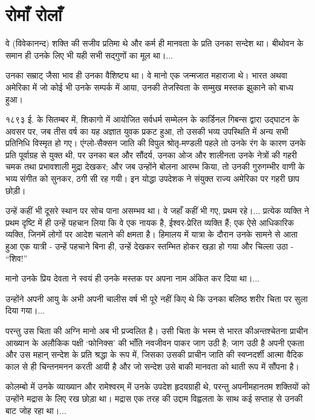 \section*{रोमाँ रोलाँ}


वे (विवेकानन्द) शक्ति की सजीव प्रतिमा थे और कर्म ही मानवता के प्रति उनका सन्देश था। बीथोवन के समान ही उनके लिए भी यही सभी सद्गुणों का मूल था।... 

उनका सम्राट् जैसा भाव ही उनका वैशिष्ट्य था। वे मानो एक जन्मजात महाराजा थे। भारत अथवा अमेरिका में जो कोई भी उनके सम्पर्क में आया, उनकी तेजस्विता के सम्मुख मस्तक झुकाने को बाध्य हुआ। 

१८९३ ई. के सितम्बर में, शिकागो में आयोजित सर्वधर्म सम्मेलन के कार्डिनल गिबन्स द्वारा उद्घाटन के अवसर पर, जब तीस वर्ष का यह अज्ञात युवक प्रकट हुआ, तो उसकी भव्य उपस्थिति में अन्य सभी प्रतिनिधि विस्मृत हो गए। एंग्लो-सैक्सन जाति की विपुल श्रोतृ-मण्डली पहले तो उनके रंग के कारण उनके प्रति पूर्वाग्रह से युक्त थी, पर उनका बल और सौंदर्य, उनका ओज और शालीनता उनके नेत्रों की गहरी चमक तथा प्रभावशाली मुद्रा देखकर; और जब उन्होंने बोलना आरम्भ किया, तो उनकी गुरुगम्भीर वाणी के भव्य संगीत को सुनकर, ठगी सी रह गयी। इन योद्धा उपदेशक ने संयुक्त राज्य अमेरिका पर गहरी छाप छोड़ी। 

उन्हें कहीं भी दूसरे स्थान पर सोच पाना असम्भव था। वे जहाँ कहीं भी गए, प्रथम रहे।... प्रत्येक व्यक्ति ने प्रथम दृष्टि में ही उन्हें पहचान लिया कि वे एक नायक है, ईश्वर-प्रेरित व्यक्ति हैं; एक ऐसे आधिकारिक व्यक्ति, जिनमें लोगों पर आदेश चलाने की क्षमता है। हिमालय में यात्रा के दौरान उनके सामने से आता हुआ एक यात्री - उन्हें पहचाने बिना ही, उन्हें देखकर स्तम्भित होकर खड़ा हो गया और चिल्ला उठा - “शिव!” 

मानो उनके प्रिय देवता ने स्वयं ही उनके मस्तक पर अपना नाम अंकित कर दिया था।... 

उन्होंने अपनी आयु के अभी अपनी चालीस वर्ष भी पूरे नहीं किए थे कि उनका बलिष्ठ शरीर चिता पर सुला दिया गया।... 

परन्तु उस चिता की अग्नि मानो अब भी प्रज्वलित है। उसी चिता के भस्म से भारत की\break अन्तश्चेतना प्राचीन आख्यान के अलौकिक पक्षी ‘फोनिक्स’ की भाँति नवजीवन पाकर जाग उठी है; जाग उठी है अपनी एकता और उस महान् सन्देश के प्रति श्रद्धा के रूप में, जिसका उसकी प्राचीन जाति की स्वप्नदर्शी आत्मा वैदिक काल से ही चिन्तनमनन करती आयी है और जो सन्देश उसे बाकी मानवता को थाती रूप में सौंपना है। 

\delimiter

कोलम्बो में उनके व्याख्यान और रामेश्वरम् में उनके उपदेश हृदयग्राही थे, परन्तु अपनी\break महानतम शक्तियों को उन्होंने मद्रास के लिए रख छोड़ा था। मद्रास एक तरह की उद्दाम विह्वलता के साथ कई सप्ताह से उनकी बाट जोह रहा था।... 

